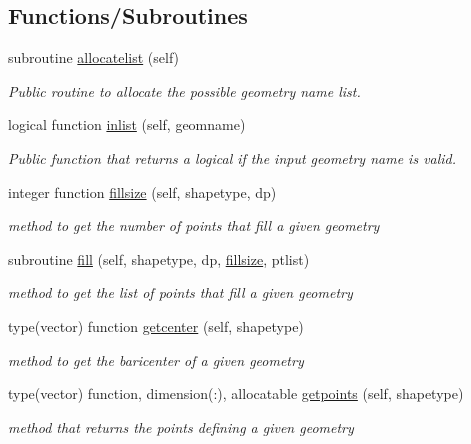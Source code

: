 \subsection*{Functions/\+Subroutines}
\begin{DoxyCompactItemize}
\item 
subroutine \mbox{\hyperlink{namespacegeometry__mod_a1b6f259b0b6be71e02ffae7670f7d8ba}{allocatelist}} (self)
\begin{DoxyCompactList}\small\item\em Public routine to allocate the possible geometry name list. \end{DoxyCompactList}\item 
logical function \mbox{\hyperlink{namespacegeometry__mod_a22dd77024fce56da299445a697256155}{inlist}} (self, geomname)
\begin{DoxyCompactList}\small\item\em Public function that returns a logical if the input geometry name is valid. \end{DoxyCompactList}\item 
integer function \mbox{\hyperlink{namespacegeometry__mod_ad790edd694561b33dad20cfa3a14e8f2}{fillsize}} (self, shapetype, dp)
\begin{DoxyCompactList}\small\item\em method to get the number of points that fill a given geometry \end{DoxyCompactList}\item 
subroutine \mbox{\hyperlink{namespacegeometry__mod_a1d97564e04562532b5389bfb91aa676b}{fill}} (self, shapetype, dp, \mbox{\hyperlink{namespacegeometry__mod_ad790edd694561b33dad20cfa3a14e8f2}{fillsize}}, ptlist)
\begin{DoxyCompactList}\small\item\em method to get the list of points that fill a given geometry \end{DoxyCompactList}\item 
type(vector) function \mbox{\hyperlink{namespacegeometry__mod_a4a38edbff02aa0ff5f16a16c39bf778e}{getcenter}} (self, shapetype)
\begin{DoxyCompactList}\small\item\em method to get the baricenter of a given geometry \end{DoxyCompactList}\item 
type(vector) function, dimension(\+:), allocatable \mbox{\hyperlink{namespacegeometry__mod_a0b1a3c5aa414292ace34d59487082e3a}{getpoints}} (self, shapetype)
\begin{DoxyCompactList}\small\item\em method that returns the points defining a given geometry \end{DoxyCompactList}\item 

\end{DoxyCompactItemize}
